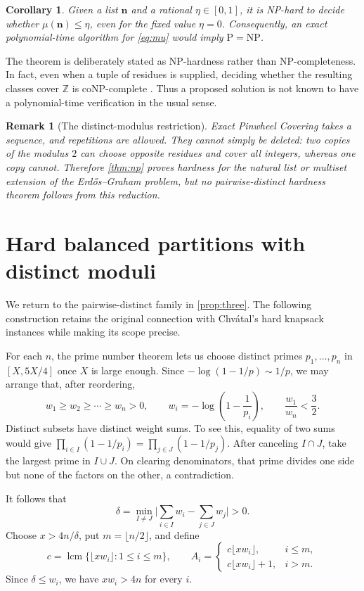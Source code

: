 \documentclass[a4paper,11pt]{article}
\newtheorem{corollary}[question]{Corollary}
\newtheorem{remark}[question]{Remark}
\newcommand{\Z}{\mathbb Z}
\newcommand{\lcmop}{\operatorname{lcm}}
\newcommand{\abs}[1]{\lvert#1\rvert}
\begin{document}
\begin{corollary}\label{cor:threshold}
Given a list $\mathbf n$ and a rational $\eta\in[0,1]$, it is NP-hard to
decide whether $\mu(\mathbf n)\leq\eta$, even for the fixed value $\eta=0$.
Consequently, an exact polynomial-time algorithm for \eqref{eq:mu} would imply
$\mathrm P=\mathrm{NP}$.
\end{corollary}

The theorem is deliberately stated as NP-hardness rather than NP-completeness.
In fact, even when a tuple of residues is supplied, deciding whether the
resulting classes cover $\Z$ is coNP-complete
\cite[Theorem~2]{KKK25}.  Thus a proposed solution is not known to have a
polynomial-time verification in the usual sense.

\begin{remark}[The distinct-modulus restriction]\label{rem:distinct}
Exact Pinwheel Covering takes a sequence, and repetitions are allowed.  They
cannot simply be deleted: two copies of the modulus $2$ can choose opposite
residues and cover all integers, whereas one copy cannot.  Therefore
\cref{thm:np} proves hardness for the natural list or multiset extension of
the Erd\H{o}s--Graham problem, but no pairwise-distinct hardness theorem follows
from this reduction.
\end{remark}

\section{Hard balanced partitions with distinct moduli}

We return to the pairwise-distinct family in \cref{prop:three}.  The following
construction retains the original connection with Chv\'atal's hard knapsack
instances while making its scope precise.

For each $n$, the prime number theorem lets us choose distinct primes
$p_1,\ldots,p_n$ in $[X,5X/4]$ once $X$ is large enough.  Since
$-\log(1-1/p)\sim1/p$, we may arrange that, after reordering,
\[
 w_1\geq w_2\geq\cdots\geq w_n>0,
 \qquad
 w_i=-\log\left(1-\frac1{p_i}\right),
 \qquad
 \frac{w_1}{w_n}<\frac32.
\]
Distinct subsets have distinct weight sums.  To see this, equality of two sums would give
\(
 \prod_{i\in I}(1-1/p_i)=\prod_{j\in J}(1-1/p_j).
\)
After canceling $I\cap J$, take the largest prime in $I\cup J$.  On clearing
denominators, that prime divides one side but none of the factors on the other,
a contradiction.

It follows that
\[
 \delta=\min_{I\neq J}
 \abs{\sum_{i\in I}w_i-\sum_{j\in J}w_j}>0.
\]
Choose $x>4n/\delta$, put $m=\lfloor n/2\rfloor$, and define
\[
 c=\lcmop\{\lfloor xw_i\rfloor:1\leq i\leq m\},
 \qquad
 A_i=
 \begin{cases}
  c\lfloor xw_i\rfloor,&i\leq m,\\
  c\lfloor xw_i\rfloor+1,&i>m.
 \end{cases}
\]
Since $\delta\leq w_i$, we have $xw_i>4n$ for every $i$.
\end{document}
